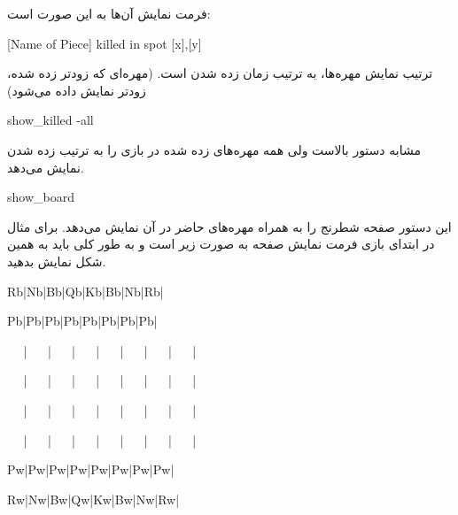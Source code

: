 \documentclass[]{article}
\begin{document}
فرمت نمایش آن‌ها به این صورت است:


\begin{tcolorbox}[boxrule=0pt]
	\begin{latin}
  	  \large{
  	  	[Name of Piece] killed in spot [x],[y]
		}
	\end{latin}
\end{tcolorbox}


ترتیب نمایش مهره‌ها، به ترتیب زمان زده شدن است. (مهره‌ای که زودتر زده شده، زودتر نمایش داده می‌شود)

\hrulefill



\begin{tcolorbox}[boxrule=0pt]
	\begin{latin}
  	  \large{
  	  	show\_killed -all
		}
	\end{latin}
\end{tcolorbox}

مشابه دستور بالاست ولی همه مهره‌های زده شده در بازی را به ترتیب زده شدن نمایش می‌دهد.

\hrulefill



\begin{tcolorbox}[boxrule=0pt]
	\begin{latin}
  	  \large{
  	  	show\_board
		}
	\end{latin}
\end{tcolorbox}

این دستور صفحه شطرنج را به همراه مهره‌های حاضر در آن نمایش می‌دهد. برای مثال در ابتدای بازی فرمت نمایش صفحه به صورت زیر است و به طور کلی باید به همین شکل نمایش بدهید.




\begin{tcolorbox}[boxrule=0pt]
	\begin{latin}
  	  \large{
  	  	Rb|Nb|Bb|Qb|Kb|Bb|Nb|Rb|
  	  	
Pb|Pb|Pb|Pb|Pb|Pb|Pb|Pb|

~~  | ~~ | ~~ | ~~ | ~~ | ~~ | ~~ | ~~ |
  
~~  | ~~ | ~~ | ~~ | ~~ | ~~ | ~~ | ~~ |
  
~~  | ~~ | ~~ | ~~ | ~~ | ~~ | ~~ | ~~ |
  
~~  | ~~ | ~~ | ~~ | ~~ | ~~ | ~~ | ~~ |
  
Pw|Pw|Pw|Pw|Pw|Pw|Pw|Pw|

Rw|Nw|Bw|Qw|Kw|Bw|Nw|Rw|

		}
	\end{latin}
\end{tcolorbox}
\end{document}
